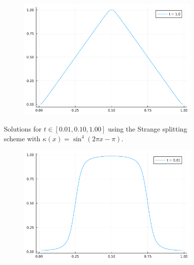\documentclass[12pt]{report}
\begin{document}
\begin{solution}
\begin{figure}[H]
\begin{subfigure}{0.495\linewidth}
        \includegraphics[width=\linewidth]{images/4a-3.png}
      \end{subfigure}
      \caption{Solutions for $t\in[0.01,0.10,1.00]$ using the Strange splitting scheme with $\kappa(x) = \sin^4(2\pi x - \pi)$.}
    \end{figure}
    \begin{figure}[H]\label{4b}
      \centering
      \begin{subfigure}{0.495\linewidth}
        \centering
        \includegraphics[width=\linewidth]{images/4b-1.png}
      \end{subfigure}
      \begin{subfigure}{0.495\linewidth}
        \centering

\end{subfigure}
\end{figure}
\end{solution}
\end{document}
